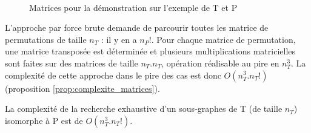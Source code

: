 \begin{figure}[ht]
\begin{center}
  \quad
  \quad
{}\\
\end{center}
\caption{Matrices pour la démonstration sur l'exemple de T et P}
\label{fig:mat-exemplesub}
\end{figure}




L'approche par force brute demande de parcourir toutes les matrice de permutations de taille $n_T$ : il y en a $n_P!$. Pour chaque matrice de permutation, une matrice transposée est déterminée et plusieurs multiplications matricielles sont faites sur des matrices de taille $n_T.n_T$, opération réalisable au pire en $n_T^3$. La complexité de cette approche dans le pire des cas est donc $O(n_T^3.n_T!)$ (proposition \ref{prop:complexite_matrices}).

\begin{prop}
La complexité de la recherche exhaustive d'un sous-graphes de T (de taille $n_T$) isomorphe à P est de $O(n_T^3.n_T!)$.
\label{prop:complexite_matrices}
\end{prop}




